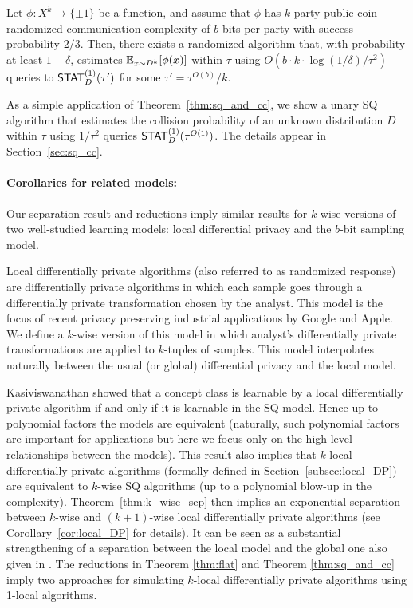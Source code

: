 \begin{theorem}\label{thm:sq_and_cc}
Let $\phi:X^k \to \{\pm 1\}$ be a function, and assume that $\phi$ has $k$-party public-coin randomized communication complexity of $b$ bits per party with success probability $2/3$. Then, there exists a randomized algorithm that, with probability at least $1-\delta$, estimates $\mathbb E_{x \sim D^k}[\phi(x)]$ within $\tau$ using $O(b \cdot k \cdot \log(1/\delta)/\tau^2)$ queries to $\mathsf{STAT}^{(1)}_D(\tau')$ for some $\tau' = \tau^{O(b)}/k$.
\end{theorem}

As a simple application of Theorem~\ref{thm:sq_and_cc}, we show a unary SQ algorithm that estimates the collision probability of an unknown distribution $D$ within $\tau$ using $1/\tau^2$ queries $\mathsf{STAT}^{(1)}_{D}(\tau^{O(1)})$. The details appear in Section~\ref{sec:sq_cc}.

\paragraph{Corollaries for related models:}
Our separation result and reductions imply similar results for $k$-wise versions of two well-studied learning models: local differential privacy and the $b$-bit sampling model. %

Local differentially private algorithms \cite{kasiviswanathan2011can} (also referred to as randomized response) are differentially private algorithms in which each sample goes through a differentially private transformation chosen by the analyst. This model is the focus of recent privacy preserving industrial applications by Google \cite{ErlingssonPK14} and Apple. We define a $k$-wise version of this model in which analyst's differentially private transformations are applied to $k$-tuples of samples. This model interpolates naturally between the usual (or global) differential privacy and the local model.

Kasiviswanathan \etal\cite{kasiviswanathan2011can} showed that a concept class is learnable by a local differentially private algorithm if and only if it is learnable in the SQ model. Hence up to polynomial factors the models are equivalent (naturally, such polynomial factors are important for applications but here we focus only on the high-level relationships between the models). This result also implies that $k$-local differentially private algorithms (formally defined in Section~\ref{subsec:local_DP}) are equivalent to $k$-wise SQ algorithms (up to a polynomial blow-up in the complexity). Theorem~\ref{thm:k_wise_sep} then implies an exponential separation between $k$-wise and $(k+1)$-wise local differentially private algorithms (see Corollary~\ref{cor:local_DP} for details). It can be seen as a substantial strengthening of a separation between the local model and the global one also given in \cite{kasiviswanathan2011can}. The reductions in Theorem \ref{thm:flat} and Theorem \ref{thm:sq_and_cc} imply two approaches for simulating  $k$-local differentially private algorithms using 1-local algorithms.

